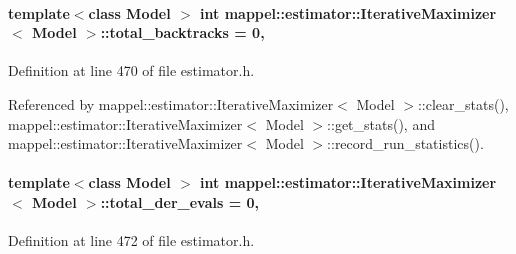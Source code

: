 \paragraph[{\texorpdfstring{total\+\_\+backtracks}{total_backtracks}}]{\setlength{\rightskip}{0pt plus 5cm}template$<$class Model $>$ int {\bf mappel\+::estimator\+::\+Iterative\+Maximizer}$<$ Model $>$\+::total\+\_\+backtracks = 0\hspace{0.3cm}{\ttfamily [protected]}, {\ttfamily [inherited]}}\hypertarget{classmappel_1_1estimator_1_1IterativeMaximizer_a1e081c237c989c530bb101bfb4791073}{}\label{classmappel_1_1estimator_1_1IterativeMaximizer_a1e081c237c989c530bb101bfb4791073}


Definition at line 470 of file estimator.\+h.



Referenced by mappel\+::estimator\+::\+Iterative\+Maximizer$<$ Model $>$\+::clear\+\_\+stats(), mappel\+::estimator\+::\+Iterative\+Maximizer$<$ Model $>$\+::get\+\_\+stats(), and mappel\+::estimator\+::\+Iterative\+Maximizer$<$ Model $>$\+::record\+\_\+run\+\_\+statistics().

\paragraph[{\texorpdfstring{total\+\_\+der\+\_\+evals}{total_der_evals}}]{\setlength{\rightskip}{0pt plus 5cm}template$<$class Model $>$ int {\bf mappel\+::estimator\+::\+Iterative\+Maximizer}$<$ Model $>$\+::total\+\_\+der\+\_\+evals = 0\hspace{0.3cm}{\ttfamily [protected]}, {\ttfamily [inherited]}}\hypertarget{classmappel_1_1estimator_1_1IterativeMaximizer_a79461b74a026ab06f9d1b4a9f96bdaa0}{}\label{classmappel_1_1estimator_1_1IterativeMaximizer_a79461b74a026ab06f9d1b4a9f96bdaa0}


Definition at line 472 of file estimator.\+h.



